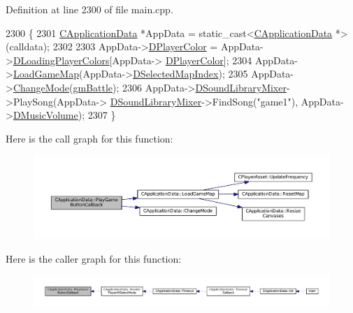 Definition at line 2300 of file main.\+cpp.


\begin{DoxyCode}
2300                                                            \{
2301     \hyperlink{classCApplicationData}{CApplicationData} *AppData = \textcolor{keyword}{static\_cast<}\hyperlink{classCApplicationData}{CApplicationData} *\textcolor{keyword}{>}(calldata);
2302     
2303     AppData->\hyperlink{classCApplicationData_a53550939b20cba70570f113e4d1c5d02}{DPlayerColor} = AppData->\hyperlink{classCApplicationData_ab29b80d90f1201608dcb498cd627a6f9}{DLoadingPlayerColors}[AppData->
      \hyperlink{classCApplicationData_a53550939b20cba70570f113e4d1c5d02}{DPlayerColor}];
2304     AppData->\hyperlink{classCApplicationData_a89af0c7917be766575720e5ac79c8d2d}{LoadGameMap}(AppData->\hyperlink{classCApplicationData_a279cfd90004e3f1b90b119358ff25586}{DSelectedMapIndex});
2305     AppData->\hyperlink{classCApplicationData_aee18c113e9a0acb3cad3d63eb19de71b}{ChangeMode}(\hyperlink{classCApplicationData_ac8ac37a4c8bb871036fbbdc6a072e403a00a1759bd54eaaa07aab7575dbae51fc}{gmBattle});
2306     AppData->\hyperlink{classCApplicationData_aa1e6876121bb4fb229ec6b930a8a6766}{DSoundLibraryMixer}->PlaySong(AppData->
      \hyperlink{classCApplicationData_aa1e6876121bb4fb229ec6b930a8a6766}{DSoundLibraryMixer}->FindSong(\textcolor{stringliteral}{"game1"}), AppData->\hyperlink{classCApplicationData_a8bc61af4a83a667102e55cca2a739c3b}{DMusicVolume});
2307 \}
\end{DoxyCode}
Here is the call graph for this function\+:
\nopagebreak
\begin{figure}[H]
\begin{center}
\leavevmode
\includegraphics[width=350pt]{classCApplicationData_a659aa43022e92610c2f8cc182eab1b8e_cgraph}
\end{center}
\end{figure}
Here is the caller graph for this function\+:
\nopagebreak
\begin{figure}[H]
\begin{center}
\leavevmode
\includegraphics[width=350pt]{classCApplicationData_a659aa43022e92610c2f8cc182eab1b8e_icgraph}
\end{center}
\end{figure}
\hypertarget{classCApplicationData_a10e56e4604f1f0823af659a7989fea9d}{}\label{classCApplicationData_a10e56e4604f1f0823af659a7989fea9d} 
